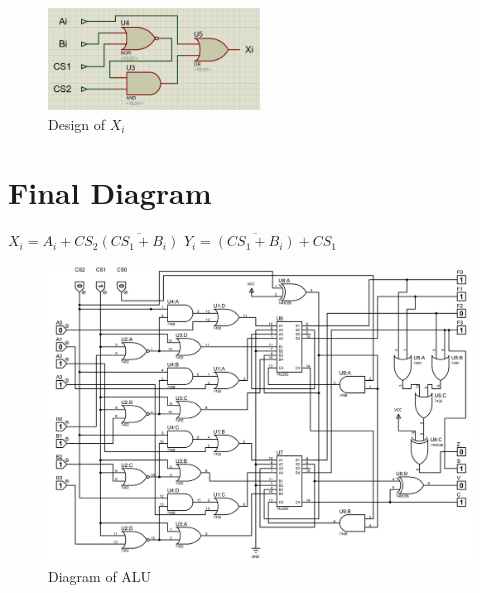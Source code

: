\documentclass[]{article}
\begin{document}
	\begin{figure}[h!]
		\centering
		\includegraphics[width = 0.5\textwidth]{Xi.PNG}
		\caption{Design of $X_i$ \newline
		}
		\label{fig:ckt1}
		
	\end{figure}

	\section{Final Diagram}
	$X_i=A_i+CS_2\overline{(CS_1+B_i)}$
	\newline
	\newline
    $Y_i = \overline{(CS_1+B_i)}+CS_1$
    \begin{figure}[h!]
		\centering
		\includegraphics[width = 1\textwidth]{Total.png}
		\caption{Diagram of ALU \newline
		}
		\label{fig:ckt1}
		
	\end{figure}
	
	
\end{document}
